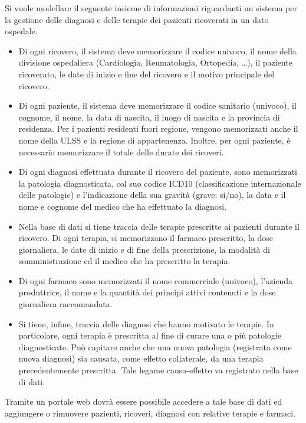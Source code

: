 \documentclass{article}
\begin{document}
Si vuole modellare il seguente insieme di informazioni riguardanti un sistema
per la gestione delle diagnosi e delle terapie dei pazienti ricoverati in un
dato ospedale.
\begin{itemize}
	\item Di ogni ricovero, il sistema deve memorizzare il codice univoco, il
	      nome della divisione ospedaliera (Cardiologia, Reumatologia, Ortopedia,
	      \dots ), il paziente ricoverato, le date di inizio e fine del ricovero
	      e il motivo principale del ricovero.

	\item Di ogni paziente, il sistema deve memorizzare il codice sanitario
	      (univoco), il cognome, il nome, la data di nascita, il luogo di nascita
	      e la provincia di residenza. Per i pazienti residenti fuori regione,
	      vengono memorizzati anche il nome della ULSS e la regione di appartenenza.
	      Inoltre, per ogni paziente, è necessario memorizzare il totale delle
	      durate dei ricoveri.

	\item Di ogni diagnosi effettuata durante il ricovero del paziente, sono
	      memorizzati la patologia diagnosticata, col suo codice ICD10
	      (classificazione internazionale delle patologie) e l’indicazione della
	      sua gravità (grave: si/no), la data e il nome e cognome del medico che
	      ha effettuato la diagnosi.

	\item Nella base di dati si tiene traccia delle terapie prescritte ai pazienti
	      durante il ricovero. Di ogni terapia, si memorizzano il farmaco prescritto,
	      la dose giornaliera, le date di inizio e di fine della prescrizione, la
	      modalità di somministrazione ed il medico che ha prescritto la terapia.

	\item Di ogni farmaco sono memorizzati il nome commerciale (univoco), l’azienda
	      produttrice, il nome e la quantità dei principi attivi contenuti e la
	      dose giornaliera raccomandata.

	\item Si tiene, infine, traccia delle diagnosi che hanno motivato le terapie.
	      In particolare, ogni terapia è prescritta al fine di curare una o più
	      patologie diagnosticate. Può capitare anche che una nuova patologia
	      (registrata come nuova diagnosi) sia causata, come effetto collaterale,
	      da una terapia precedentemente prescritta. Tale legame causa-effetto va
	      registrato nella base di dati.
\end{itemize}
Tramite un portale web dovrà essere possibile accedere a tale base di dati ed
aggiungere o rimuovere pazienti, ricoveri, diagnosi con relative terapie e farmaci.
\end{document}
